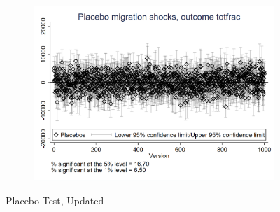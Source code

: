 \documentclass{article}
\begin{document}
\begin{figure}[htbp]
\begin{subfigure}{0.3\textwidth}
        \includegraphics[width=\linewidth]{exhibits/figures/exogeneity_tests/D17_placebo_totfrac_urban.png}
        \label{fig:sub6}
    \end{subfigure}

    \caption{Placebo Test, Updated}
    \label{fig:all}
\end{figure}
\clearpage
\end{document}
